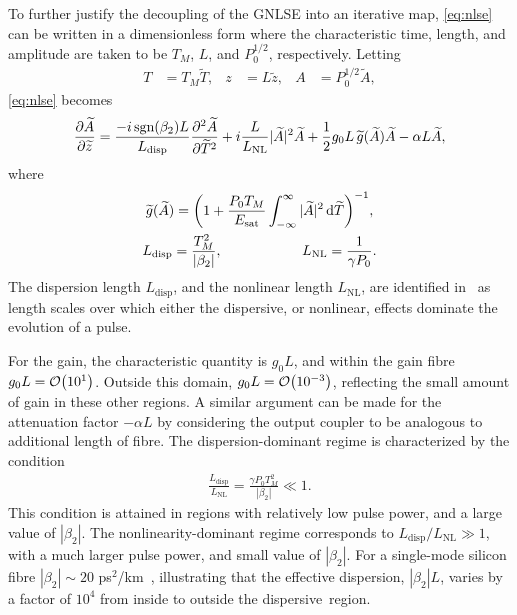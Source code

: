 \documentclass[9pt,twocolumn,twoside]{osajnl}
\let\originalleft\left
\let\originalright\right
\renewcommand{\left}{\mathopen{}\mathclose\bgroup\originalleft}
\renewcommand{\right}{\aftergroup\egroup\originalright}
\providecommand{\df}{\textrm{d}} %
\newcommand{\pdiff}[3][\hspace{-0.5pt}]{\frac{\partial^{#1}#2}{\partial{#3}^{#1}}} %
\newcommand{\Es}{E_{\textrm{sat}}} %
\providecommand{\bigO}[1]{\ensuremath{\mathop{}\mathopen{}\mathcal{O}\mathopen{}\left(#1\right)}} %
\begin{document}
To further justify the decoupling of the GNLSE into an iterative map, \eqref{eq:nlse} can be written in a dimensionless form where the characteristic time, length, and amplitude are taken to be $T_M$, $L$, and $P_0^{1/2}$, respectively. Letting
\begin{align}
	T &= T_M \widetilde{T}, & z &= L \widetilde{z}, & A &= P_0^{1/2} \widetilde{A},
\end{align}
\eqref{eq:nlse} becomes
\begin{align}
	\pdiff{\widetilde{A}}{\widetilde{z}} = \frac{-i \, \textrm{sgn}(\beta_2) L}{L_\textrm{disp}} \pdiff[2]{\widetilde{A}}{\widetilde{T}} + i \frac{L}{L_\textrm{NL}} |\widetilde{A}|^2 \widetilde{A} + \frac{1}{2}g_0 L \, \widetilde{g}(\widetilde{A}) \widetilde{A} - \alpha L \widetilde{A},
	\label{eq:ndgnlse}
\end{align}
where
\begin{equation}
	\begin{gathered}
		\widetilde{g}(\widetilde{A}) = \left( 1 + \frac{P_0 T_M}{\Es} \int_{-\infty}^\infty |\widetilde{A}|^2 \, \df \widetilde{T} \right)^{-1}, \\
		L_\textrm{disp} = \frac{T_M^2}{|\beta_2|}, \hspace{2cm} L_\textrm{NL} = \frac{1}{\gamma P_0}.
	\end{gathered}
\end{equation}
The dispersion length $L_\textrm{disp}$, and the nonlinear length $L_\textrm{NL}$, are identified in~\cite{agrawal2013} as length scales over which either the dispersive, or nonlinear, effects dominate the evolution of a pulse.

For the gain, the characteristic quantity is $g_0 L$, and within the gain fibre $g_0 L = \bigO{10^1}$. Outside this domain, $g_0 L = \bigO{10^{-3}}$, reflecting the small amount of gain in these other regions. A similar argument can be made for the attenuation factor $-\alpha L$ by considering the output coupler to be analogous to additional length of fibre. The dispersion-dominant regime is characterized by the condition~\cite{agrawal2013}
\begin{align}
	\frac{L_\textrm{disp}}{L_\textrm{NL}} = \frac{\gamma P_0 T_M^2}{|\beta_2|} \ll 1.
\end{align}
This condition is attained in regions with relatively low pulse power, and a large value of $|\beta_2|$. The nonlinearity-dominant regime corresponds to $L_\textrm{disp} / L_\textrm{NL} \gg 1$, with a much larger pulse power, and small value of $|\beta_2|$. For a single-mode silicon fibre $|\beta_2| \sim 20$ ps$^2$/km~\cite{agrawal2013}, illustrating that the effective dispersion, $|\beta_2| L$, varies by a factor of $10^4$ from inside to outside the dispersive~region.
\end{document}
